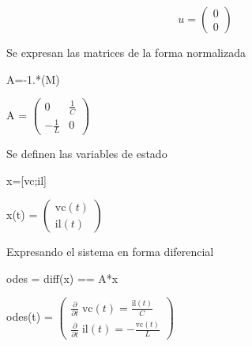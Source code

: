 \documentclass[10pt,a4paper]{article} %
\begin{document}
	\begin{par}
		$$u=\begin{pmatrix}
		0\\0
		\end{pmatrix}$$
	\end{par}
	
	\begin{par}
		\begin{flushleft}
			Se expresan las matrices de la forma normalizada
		\end{flushleft}
	\end{par}
	
	\begin{matlabcode}
		A=-1.*(M\N)
	\end{matlabcode}
	\begin{matlabsymbolicoutput}
		A = 
		$\displaystyle \left(\begin{array}{cc}
		0 & \frac{1}{C}\\
		-\frac{1}{L} & 0
		\end{array}\right)$
	\end{matlabsymbolicoutput}
	
	\begin{par}
		\begin{flushleft}
			Se definen las variables de estado
		\end{flushleft}
	\end{par}
	
	\begin{matlabcode}
		x=[vc;il]
	\end{matlabcode}
	\begin{matlabsymbolicoutput}
		x(t) = 
		$\displaystyle \left(\begin{array}{c}
		\textrm{vc}\left(t\right)\\
		\textrm{il}\left(t\right)
		\end{array}\right)$
	\end{matlabsymbolicoutput}
	
	\begin{par}
		\begin{flushleft}
			Expresando el sistema en forma diferencial
		\end{flushleft}
	\end{par}
	
	\begin{matlabcode}
		odes = diff(x) == A*x
	\end{matlabcode}
	\begin{matlabsymbolicoutput}
		odes(t) = 
		$\displaystyle \left(\begin{array}{c}
		\frac{\partial }{\partial t}\;\textrm{vc}\left(t\right)=\frac{\textrm{il}\left(t\right)}{C}\\
		\frac{\partial }{\partial t}\;\textrm{il}\left(t\right)=-\frac{\textrm{vc}\left(t\right)}{L}
		\end{array}\right)$
	\end{matlabsymbolicoutput}
	
\end{document}
